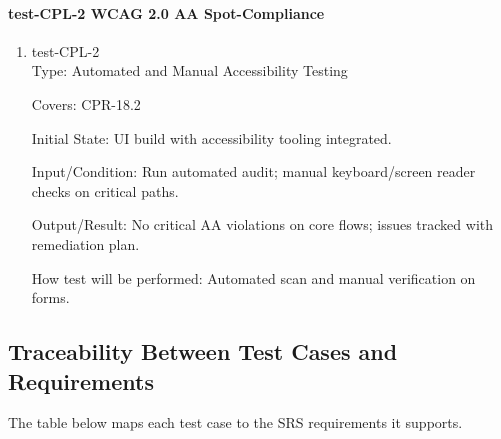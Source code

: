 \documentclass[12pt, titlepage]{article}
\begin{document}
\paragraph{test-CPL-2 WCAG 2.0 AA Spot-Compliance}

\begin{enumerate}
\item{test-CPL-2\\}
Type: Automated and Manual Accessibility Testing

Covers: CPR-18.2

Initial State: UI build with  accessibility tooling integrated.

Input/Condition: Run automated audit; manual keyboard/screen reader checks on critical paths.

Output/Result: No critical AA violations on core flows; issues tracked with remediation plan.

How test will be performed: Automated scan and manual verification on forms.
\end{enumerate}

\subsection{Traceability Between Test Cases and Requirements}

The table below maps each test case to the SRS requirements it supports.
\end{document}
